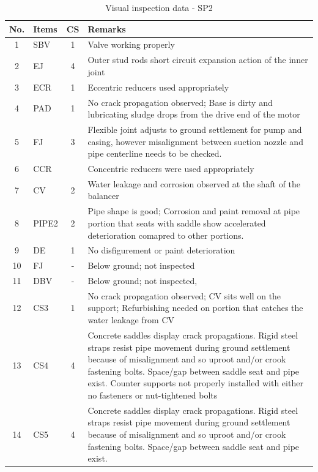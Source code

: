 \begin{table}[!h]
	\caption{Visual inspection data - SP2}
	\label{ch04_visualinspectionsp2}
		{\scriptsize
\begin{tabular}{c|l|c|p{12cm}}
\hline
No. & Items & CS & Remarks \\ 
\hline
1 & SBV & 1 & Valve working properly  \\ 
2 & EJ & 4 & Outer stud rods short circuit expansion action of the inner joint \\ 
3 & ECR & 1 & Eccentric reducers used appropriately \\ 
4 & PAD & 1 & No crack propagation observed; Base is dirty and lubricating sludge drops from the drive end of the motor \\ 
5 & FJ & 3 & Flexible joint adjusts to ground settlement for pump and casing, however misalignment between suction nozzle and pipe centerline needs to be checked. \\ 
6 & CCR &  & Concentric reducers were used appropriately \\ 
7 & CV & 2 & Water leakage and corrosion observed at the shaft of the balancer \\ 
8 & PIPE2 & 2 & Pipe shape is good; Corrosion and paint removal at pipe portion that seats with saddle show accelerated deterioration comapred to other portions.  \\ 
9 & DE & 1 & No disfigurement or paint deterioration \\ 
10 & FJ & - & Below ground; not inspected \\ 
11 & DBV & - & Below ground; not inspected, \\ 
12 & CS3 & 1 & No crack propagation observed; CV sits well on the support; Refurbishing needed on portion that catches the water leakage from CV \\ 
13 & CS4 & 4 & Concrete saddles display crack propagations. Rigid steel straps resist pipe movement during ground settlement because of misalignment and so uproot and/or crook fastening bolts. Space/gap between saddle seat and pipe exist. Counter supports not properly installed with either no fasteners or nut-tightened bolts \\ 
14 & CS5 & 4 & Concrete saddles display crack propagations. Rigid steel straps resist pipe movement during ground settlement because of misalignment and so uproot and/or crook fastening bolts. Space/gap between saddle seat and pipe exist. \\ 
\hline
\end{tabular}
	}
\end{table}

